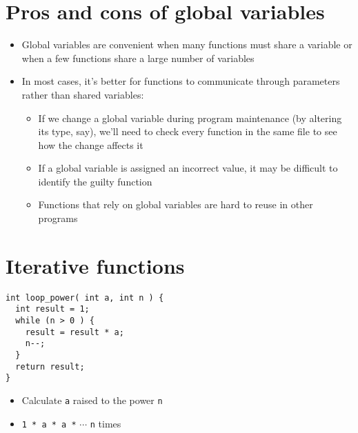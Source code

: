 \documentclass{article}
\begin{document}
\section{Pros and cons of global variables}
\begin{itemize}
\item Global variables are convenient when many functions must share a variable or when a few functions share a large number of variables
\item In most cases, it's better for functions to communicate through parameters rather than shared variables:
\begin{itemize}
\item If we change a global variable during program maintenance (by altering its type, say), we'll need to check every function in the same file to see how the change affects it
\item If a global variable is assigned an incorrect value, it may be difficult to identify the guilty function
\item Functions that rely on global variables are hard to reuse in other programs
\end{itemize}
\end{itemize}



\section{Iterative functions}
\begin{verbatim}
int loop_power( int a, int n ) {
  int result = 1;
  while (n > 0 ) {
    result = result * a;
    n--;
  }
  return result;
}
\end{verbatim}

\begin{itemize}
\item Calculate \verb!a! raised to the power \verb!n!
\item \verb!1 * a * a *!  $\cdots$ \verb!n! times
\end{itemize}
\end{document}
